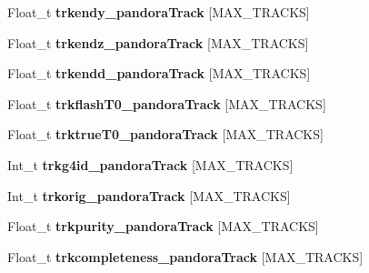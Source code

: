\begin{DoxyCompactItemize}
\item 
\hypertarget{classanatree_a8e86649f69570da1a7558c900d034f96}{Float\-\_\-t {\bfseries trkendy\-\_\-pandora\-Track} \mbox{[}M\-A\-X\-\_\-\-T\-R\-A\-C\-K\-S\mbox{]}}\label{classanatree_a8e86649f69570da1a7558c900d034f96}

\item 
\hypertarget{classanatree_ac496000d1ab5e9df726be9479b555267}{Float\-\_\-t {\bfseries trkendz\-\_\-pandora\-Track} \mbox{[}M\-A\-X\-\_\-\-T\-R\-A\-C\-K\-S\mbox{]}}\label{classanatree_ac496000d1ab5e9df726be9479b555267}

\item 
\hypertarget{classanatree_a7d2564f9236dcb1f4e46a12f8c1c3718}{Float\-\_\-t {\bfseries trkendd\-\_\-pandora\-Track} \mbox{[}M\-A\-X\-\_\-\-T\-R\-A\-C\-K\-S\mbox{]}}\label{classanatree_a7d2564f9236dcb1f4e46a12f8c1c3718}

\item 
\hypertarget{classanatree_a0d362559e2753b7fea4325c329652bbc}{Float\-\_\-t {\bfseries trkflash\-T0\-\_\-pandora\-Track} \mbox{[}M\-A\-X\-\_\-\-T\-R\-A\-C\-K\-S\mbox{]}}\label{classanatree_a0d362559e2753b7fea4325c329652bbc}

\item 
\hypertarget{classanatree_a2f8def2074189a5c4ca452123bfdb752}{Float\-\_\-t {\bfseries trktrue\-T0\-\_\-pandora\-Track} \mbox{[}M\-A\-X\-\_\-\-T\-R\-A\-C\-K\-S\mbox{]}}\label{classanatree_a2f8def2074189a5c4ca452123bfdb752}

\item 
\hypertarget{classanatree_a3f305344ffa47d19d64ba4191b7b4295}{Int\-\_\-t {\bfseries trkg4id\-\_\-pandora\-Track} \mbox{[}M\-A\-X\-\_\-\-T\-R\-A\-C\-K\-S\mbox{]}}\label{classanatree_a3f305344ffa47d19d64ba4191b7b4295}

\item 
\hypertarget{classanatree_a042a0c394e2ef31d4a0c98b35742eaaf}{Int\-\_\-t {\bfseries trkorig\-\_\-pandora\-Track} \mbox{[}M\-A\-X\-\_\-\-T\-R\-A\-C\-K\-S\mbox{]}}\label{classanatree_a042a0c394e2ef31d4a0c98b35742eaaf}

\item 
\hypertarget{classanatree_a67264ab449821d6add354177992fda96}{Float\-\_\-t {\bfseries trkpurity\-\_\-pandora\-Track} \mbox{[}M\-A\-X\-\_\-\-T\-R\-A\-C\-K\-S\mbox{]}}\label{classanatree_a67264ab449821d6add354177992fda96}

\item 
\hypertarget{classanatree_ae61e5564601170300a2631b20ac7de0d}{Float\-\_\-t {\bfseries trkcompleteness\-\_\-pandora\-Track} \mbox{[}M\-A\-X\-\_\-\-T\-R\-A\-C\-K\-S\mbox{]}}\label{classanatree_ae61e5564601170300a2631b20ac7de0d}


\end{DoxyCompactItemize}
